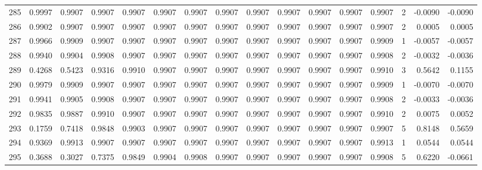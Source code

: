 \begin{tabular}{lrrrrrrrrrrrrrrr}
285 &      0.9997 &  0.9907 &  0.9907 &  0.9907 &  0.9907 &  0.9907 &  0.9907 &  0.9907 &  0.9907 &  0.9907 &   0.9907 &     0.9907 &      2 &                   -0.0090 &                    -0.0090 \\
286 &      0.9902 &  0.9907 &  0.9907 &  0.9907 &  0.9907 &  0.9907 &  0.9907 &  0.9907 &  0.9907 &  0.9907 &   0.9907 &     0.9907 &      2 &                    0.0005 &                     0.0005 \\
287 &      0.9966 &  0.9909 &  0.9907 &  0.9907 &  0.9907 &  0.9907 &  0.9907 &  0.9907 &  0.9907 &  0.9907 &   0.9907 &     0.9909 &      1 &                   -0.0057 &                    -0.0057 \\
288 &      0.9940 &  0.9904 &  0.9908 &  0.9907 &  0.9907 &  0.9907 &  0.9907 &  0.9907 &  0.9907 &  0.9907 &   0.9907 &     0.9908 &      2 &                   -0.0032 &                    -0.0036 \\
289 &      0.4268 &  0.5423 &  0.9316 &  0.9910 &  0.9907 &  0.9907 &  0.9907 &  0.9907 &  0.9907 &  0.9907 &   0.9907 &     0.9910 &      3 &                    0.5642 &                     0.1155 \\
290 &      0.9979 &  0.9909 &  0.9907 &  0.9907 &  0.9907 &  0.9907 &  0.9907 &  0.9907 &  0.9907 &  0.9907 &   0.9907 &     0.9909 &      1 &                   -0.0070 &                    -0.0070 \\
291 &      0.9941 &  0.9905 &  0.9908 &  0.9907 &  0.9907 &  0.9907 &  0.9907 &  0.9907 &  0.9907 &  0.9907 &   0.9907 &     0.9908 &      2 &                   -0.0033 &                    -0.0036 \\
292 &      0.9835 &  0.9887 &  0.9910 &  0.9907 &  0.9907 &  0.9907 &  0.9907 &  0.9907 &  0.9907 &  0.9907 &   0.9907 &     0.9910 &      2 &                    0.0075 &                     0.0052 \\
293 &      0.1759 &  0.7418 &  0.9848 &  0.9903 &  0.9907 &  0.9907 &  0.9907 &  0.9907 &  0.9907 &  0.9907 &   0.9907 &     0.9907 &      5 &                    0.8148 &                     0.5659 \\
294 &      0.9369 &  0.9913 &  0.9907 &  0.9907 &  0.9907 &  0.9907 &  0.9907 &  0.9907 &  0.9907 &  0.9907 &   0.9907 &     0.9913 &      1 &                    0.0544 &                     0.0544 \\
295 &      0.3688 &  0.3027 &  0.7375 &  0.9849 &  0.9904 &  0.9908 &  0.9907 &  0.9907 &  0.9907 &  0.9907 &   0.9907 &     0.9908 &      5 &                    0.6220 &                    -0.0661 \\

\end{tabular}
